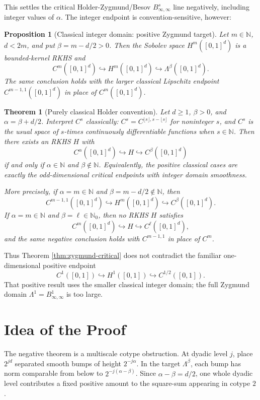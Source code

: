 \documentclass[11pt]{article}
\newtheorem{theorem}{Theorem}
\newtheorem{proposition}{Proposition}
\newcommand{\N}{\mathbb{N}}
\newcommand{\Lam}{\Lambda}
\begin{document}
This settles the critical Holder-Zygmund/Besov \(B^s_{\infty,\infty}\) line
negatively, including integer values of \(\alpha\). The integer endpoint is
convention-sensitive, however:

\begin{proposition}[Classical integer domain: positive Zygmund target]\label{prop:classical-positive}
Let \(m\in\N\), \(d<2m\), and put \(\beta=m-d/2>0\). Then the Sobolev
space \(H^m([0,1]^d)\) is a bounded-kernel RKHS and
\[
  C^m([0,1]^d)\hookrightarrow H^m([0,1]^d)
  \hookrightarrow \Lam^\beta([0,1]^d).
\]
The same conclusion holds with the larger classical Lipschitz endpoint
\(C^{m-1,1}([0,1]^d)\) in place of \(C^m([0,1]^d)\).
\end{proposition}

\begin{theorem}[Purely classical Holder convention]\label{thm:classical-classification}
Let \(d\ge1\), \(\beta>0\), and \(\alpha=\beta+d/2\). Interpret
\(C^s\) classically: \(C^s=C^{\lfloor s\rfloor,s-\lfloor s\rfloor}\) for
noninteger \(s\), and \(C^s\) is the usual space of \(s\)-times continuously
differentiable functions when \(s\in\N\). Then there exists an RKHS \(H\)
with
\[
  C^\alpha([0,1]^d)\hookrightarrow H
  \hookrightarrow C^\beta([0,1]^d)
\]
if and only if \(\alpha\in\N\) and \(\beta\notin\N\). Equivalently, the
positive classical cases are exactly the odd-dimensional critical endpoints
with integer domain smoothness.

More precisely, if \(\alpha=m\in\N\) and \(\beta=m-d/2\notin\N\), then
\[
  C^{m-1,1}([0,1]^d)\hookrightarrow H^m([0,1]^d)
  \hookrightarrow C^\beta([0,1]^d).
\]
If \(\alpha=m\in\N\) and \(\beta=\ell\in\N_0\), then no RKHS \(H\) satisfies
\[
  C^m([0,1]^d)\hookrightarrow H\hookrightarrow C^\ell([0,1]^d),
\]
and the same negative conclusion holds with \(C^{m-1,1}\) in place of
\(C^m\).
\end{theorem}

Thus Theorem \ref{thm:zygmund-critical} does not contradict the familiar
one-dimensional positive endpoint
\[
  C^1([0,1])\hookrightarrow H^1([0,1])\hookrightarrow C^{1/2}([0,1]).
\]
That positive result uses the smaller classical integer domain; the full
Zygmund domain \(\Lam^1=B^1_{\infty,\infty}\) is too large.

\section*{Idea of the Proof}

The negative theorem is a multiscale cotype obstruction. At dyadic level
\(j\), place \(2^{jd}\) separated smooth bumps of height \(2^{-j\alpha}\).
In the target \(\Lam^\beta\), each bump has norm comparable from below to
\(2^{-j(\alpha-\beta)}\). Since \(\alpha-\beta=d/2\), one whole dyadic
level contributes a fixed positive amount to the square-sum appearing in
cotype \(2\).
\end{document}
